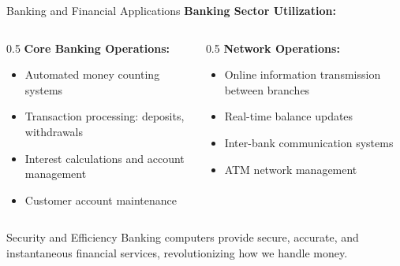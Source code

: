 \documentclass[aspectratio=169]{beamer}
\begin{document}
\begin{frame}{Banking and Financial Applications}
    \textbf{Banking Sector Utilization:}
    
    \begin{columns}
        \begin{column}{0.5\textwidth}
            \textbf{Core Banking Operations:}
            \begin{itemize}
                \item Automated money counting systems
                \item Transaction processing: deposits, withdrawals
                \item Interest calculations and account management
                \item Customer account maintenance
            \end{itemize} 

        \end{column}
        \begin{column}{0.5\textwidth}
                        \textbf{Network Operations:}
            \begin{itemize}
                \item Online information transmission between branches
                \item Real-time balance updates
                \item Inter-bank communication systems
                \item ATM network management
            \end{itemize}
        \end{column}
    \end{columns}
    
    \begin{exampleblock}{Security and Efficiency}
        Banking computers provide secure, accurate, and instantaneous financial services, revolutionizing how we handle money.
    \end{exampleblock}
\end{frame}
\end{document}
